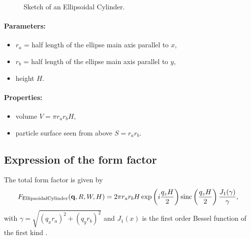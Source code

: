 \begin{figure}[ht]
\hfill
{}
\hfill
{}
\hfill
\caption{Sketch of an Ellipsoidal Cylinder.}
\label{fig:ellipscylinder}
\end{figure}

\paragraph{Parameters:}
\begin{itemize}
\item $r_a$ = half length of the ellipse main axis parallel to $x$,
\item$r_b$ = half length of the ellipse main axis parallel to $y$, 
\item height $H$.
\end{itemize}

\paragraph{Properties:}
\begin{itemize}
\item volume $V = \pi r_a r_bH$,
\item particle surface seen from above $S = r_a r_b$.
\end{itemize}

\subsection{Expression of the form factor}
The total form factor is given by 
\begin{equation*}
F_{\rm{EllipsoidalCylinder}}(\mathbf{q},R,W,H) = 2\pi r_a r_b H \exp\left(i\frac{q_z
  H}{2}\right)\operatorname{sinc}\left(\frac{q_z H}{2}\right) \frac{J_1(\gamma)}{\gamma},
\end{equation*}
with $\gamma=\sqrt{(q_x r_a)^2+(q_y r_b)^2}$ and $J_1(x)$ is the first order
Bessel function of the first kind \cite{AbSt64}.

